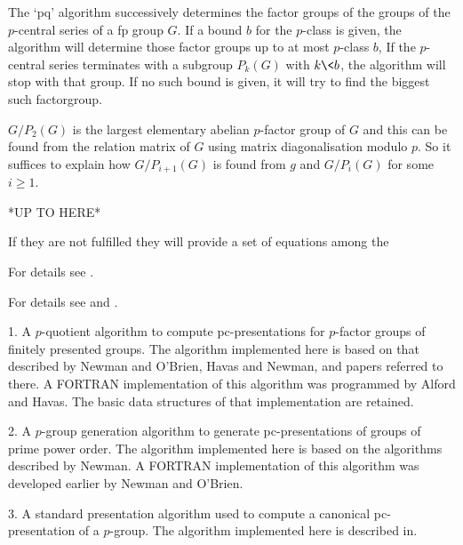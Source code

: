 The `pq'  algorithm successively determines  the factor groups  of the
groups of the $p$-central series of a fp group $G$. If a bound $b$ for
the  $p$-class is  given, the  algorithm will  determine  those factor
groups  up  to  at  most  $p$-class $b$,  If  the  $p$-central  series
terminates with a subgroup $P_k(G)$  with $k \< b$, the algorithm will
stop with that group.  If no such  bound is given, it will try to find
the biggest such factorgroup.

$G/P_2(G)$ is  the largest elementary abelian $p$-factor  group of $G$
and this  can be found  from the relation  matrix of $G$  using matrix
diagonalisation   modulo  $p$.   So   it  suffices   to  explain   how
$G/P_{i+1}(G)$ is found from $g$ and $G/P_i(G)$ for some $i \ge 1$.


*UP TO HERE*

If they are  not fulfilled they will provide a  set of equations among
the 


For details see \cite{OBr94}.



For details see \cite{New77} and \cite{OBr90}.



\beginlist

\item{1.}
A $p$-quotient  algorithm  to  compute  pc-presentations  for  $p$-factor
groups of finitely presented groups. The algorithm  implemented  here  is
based on that described by Newman  and  O'Brien,  Havas  and
Newman, and papers referred to there. 
A FORTRAN implementation of this algorithm was programmed by  Alford  and
Havas. The basic data structures of that implementation are retained.

\item{2.} 
A $p$-group generation algorithm to generate pc-presentations  of  groups
of prime power order. The algorithm implemented  here  is  based  on  the
algorithms described by Newman.  A
FORTRAN implementation of this algorithm was developed earlier by  Newman
and O'Brien.

\item{3.}
A  standard  presentation  algorithm  used   to   compute   a   canonical
pc-presentation  of  a  $p$-group.  The  algorithm  implemented  here  is
described in.

